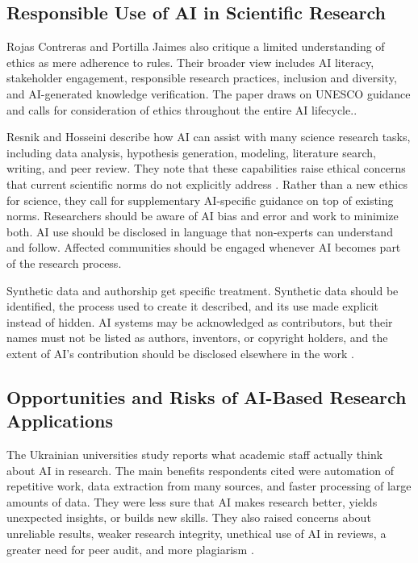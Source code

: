 \documentclass[sn-basic,Numbered]{sn-jnl}
\begin{document}
\subsection{Responsible Use of AI in Scientific Research}

Rojas Contreras and Portilla Jaimes also critique a limited understanding of ethics as mere adherence to rules. Their broader view includes AI literacy, stakeholder engagement, responsible research practices, inclusion and diversity, and AI-generated knowledge verification. The paper draws on UNESCO guidance and calls for consideration of ethics throughout the entire AI lifecycle.\cite{rojas2024aiethics}.

Resnik and Hosseini describe how AI can assist with many science research tasks, including data analysis, hypothesis generation, modeling, literature search, writing, and peer review. They note that these capabilities raise ethical concerns that current scientific norms do not explicitly address \cite{resnik2025ethics}. Rather than a new ethics for science, they call for supplementary AI-specific guidance on top of existing norms. Researchers should be aware of AI bias and error and work to minimize both. AI use should be disclosed in language that non-experts can understand and follow. Affected communities should be engaged whenever AI becomes part of the research process.

Synthetic data and authorship get specific treatment. Synthetic data should be identified, the process used to create it described, and its use made explicit instead of hidden. AI systems may be acknowledged as contributors, but their names must not be listed as authors, inventors, or copyright holders, and the extent of AI's contribution should be disclosed elsewhere in the work \cite{resnik2025ethics}.

\subsection{Opportunities and Risks of AI-Based Research Applications}

The Ukrainian universities study reports what academic staff actually think about AI in research. The main benefits respondents cited were automation of repetitive work, data extraction from many sources, and faster processing of large amounts of data. They were less sure that AI makes research better, yields unexpected insights, or builds new skills. They also raised concerns about unreliable results, weaker research integrity, unethical use of AI in reviews, a greater need for peer audit, and more plagiarism \cite{bazeliuk2025opportunities}.
\end{document}
